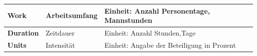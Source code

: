 \begin{tabular}{|l|l|l|}
		\hline \textbf{Work}& Arbeitsumfang & Einheit: Anzahl Personentage, Mannstunden\\
		\hline \textbf{Duration} & Zeitdauer & Einheit: Anzahl Stunden,Tage\\
		\hline \textbf{Units}& Intensität& Einheit: Angabe der Beteiligung in Prozent\\
		\hline
\end{tabular}